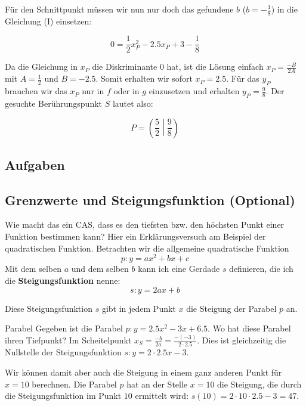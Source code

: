 Für den Schnittpunkt müssen wir nun nur doch das gefundene $b$ ($b =
-\frac{1}{8}$) in die Gleichung (I) einsetzen:

$$0 = \frac{1}{2}x_P^2 - 2.5x_P +3 - \frac{1}{8}$$

Da die Gleichung in $x_P$ die Diskriminante 0 hat, ist die Lösung
einfach $x_P = \frac{-B}{2A}$ mit $A = \frac{1}{2}$ und
$B=-2.5$. Somit erhalten wir sofort $x_P = 2.5$. Für das $y_P$
brauchen wir das $x_P$ nur in $f$ oder in $g$ einzusetzen und
erhalten $y_P =\frac{9}{8}$. Der gesuchte Berührungspunkt $S$ lautet
also:

$$P = \left(\frac{5}{2}\middle|\frac{9}{8}\right)$$


\subsection{Aufgaben}
\newpage


\subsection{Grenzwerte und Steigungsfunktion (Optional)}

Wie macht das ein CAS, dass es den tiefsten bzw. den höchsten Punkt
einer Funktion bestimmen kann? Hier ein Erklärungsversuch am Beispiel
der quadratischen Funktion.
Betrachten wir die allgemeine quadratische Funktion $$p: y=ax^2 + bx +
c$$
Mit dem selben $a$ und dem selben $b$ kann ich eine Gerdade $s$
definieren, die ich die \textbf{Steigungsfunktion} nenne:
$$s: y= 2ax+b$$

Diese Steigungsfunktion $s$ gibt in jedem Punkt $x$ die Steigung der
Parabel $p$ an.

\begin{beispiel}{Parabel}{}
  Gegeben ist die Parabel $p: y=2.5x^2 - 3x + 6.5$. Wo hat diese Parabel
  ihren Tiefpunkt? Im Scheitelpunkt $x_S =
  \frac{-b}{2a} = \frac{-(-3)}{2\cdot{}2.5}$. Dies ist gleichzeitig die Nullstelle der
  Steigungsfunktion $s: y= 2\cdot{}2.5x - 3$.

  Wir können damit aber auch die Steigung in einem ganz anderen Punkt
  \zB für $x=10$ berechnen. Die Parabel $p$ hat an der Stelle $x=10$
  die Steigung, die durch die Steigungsfunktion im Punkt $10$
  ermittelt wird: $s(10) = 2\cdot{}10\cdot{2.5} - 3 = 47$.
  
\end{beispiel}

